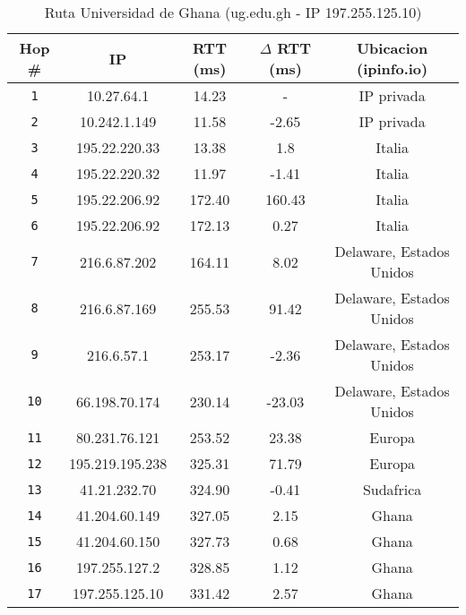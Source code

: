 \begin{table}[ht]\begin{center}
    \begin{tabular}{|c|c|c|c|c|}
    \hline
    \textbf{Hop \#} & \textbf{IP} & \textbf{RTT (ms)} & \textbf{$\Delta$ RTT (ms)} & \textbf{Ubicacion (ipinfo.io)} \\ \hline
    \texttt{1}  & 10.27.64.1      & 14.23             & -                     & IP privada                     \\ \hline
    \texttt{2}  & 10.242.1.149    & 11.58             & -2.65                 & IP privada                     \\ \hline
    \texttt{3}  & 195.22.220.33   & 13.38             & 1.8                   & Italia                         \\ \hline
    \texttt{4}  & 195.22.220.32   & 11.97             & -1.41                 & Italia                         \\ \hline
    \texttt{5}  & 195.22.206.92   & 172.40            & 160.43                & Italia                         \\ \hline
    \texttt{6}  & 195.22.206.92   & 172.13            & 0.27                  & Italia                         \\ \hline
    \texttt{7}  & 216.6.87.202    & 164.11            & 8.02                  & Delaware, Estados Unidos       \\ \hline
    \texttt{8}  & 216.6.87.169    & 255.53            & 91.42                 & Delaware, Estados Unidos       \\ \hline
    \texttt{9}  & 216.6.57.1      & 253.17            & -2.36                 & Delaware, Estados Unidos       \\ \hline
    \texttt{10} & 66.198.70.174   & 230.14            & -23.03                & Delaware, Estados Unidos       \\ \hline
    \texttt{11} & 80.231.76.121   & 253.52            & 23.38                 & Europa                         \\ \hline
    \texttt{12} & 195.219.195.238 & 325.31            & 71.79                 & Europa                         \\ \hline
    \texttt{13} & 41.21.232.70    & 324.90            & -0.41                 & Sudafrica                      \\ \hline
    \texttt{14} & 41.204.60.149   & 327.05            & 2.15                  & Ghana                          \\ \hline
    \texttt{15} & 41.204.60.150   & 327.73            & 0.68                  & Ghana                          \\ \hline
    \texttt{16} & 197.255.127.2   & 328.85            & 1.12                  & Ghana                          \\ \hline
    \texttt{17} & 197.255.125.10  & 331.42            & 2.57                  & Ghana                          \\ \hline
    \end{tabular}
    \caption{Ruta Universidad de Ghana (ug.edu.gh  - IP 197.255.125.10)}
\end{center}
\end{table}

